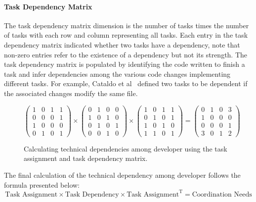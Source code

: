 \paragraph{Task Dependency Matrix}
The task dependency matrix dimension is the number of tasks times the number of tasks with each row and column representing all tasks.
Each entry in the task dependency matrix indicated whether two tasks have a dependency, note that non-zero entries refer to the existence of a dependency but not its strength.
The task dependency matrix is populated by identifying the code written to finish a task and infer dependencies among the various code changes implementing different tasks.
For example, Cataldo et al~\cite{cataldo:cscw:2006} defined two tasks to be dependent if the associated changes modify the same file. 

\begin{figure}[t!]
\centering
\[
\left(
\begin{matrix}
1 & 0 & 1 & 1\\
0 & 0 & 0 & 1\\
1 & 0 & 0 & 0\\
0 & 1 & 0 & 1
\end{matrix}
\right)
\times
\left(
\begin{matrix}
0 & 1 & 0 & 0\\
1 & 0 & 1 & 0\\
0 & 1 & 0 & 1\\
0 & 0 & 1 & 0
\end{matrix}
\right)
\times
\left(
\begin{matrix}
1 & 0 & 1 & 1\\
0 & 1 & 0 & 1\\
1 & 0 & 1 & 0\\
1 & 1 & 0 & 1
\end{matrix}
\right)
=
\left(
\begin{matrix}
0 & 1 & 0 & 3\\
1 & 0 & 0 & 0\\
0 & 0 & 0 & 1\\
3 & 0 & 1 & 2
\end{matrix}
\right)
\]
\caption{Calculating technical dependencies among developer using the task assignment and task dependency matrix.}
\label{chap:3:fig:example:stc:cataldo}
\end{figure}
The final calculation of the technical dependency among developer follows the formula presented below:
\begin{equation}
\label{eq:stc:cataldo}
\text{Task Assignment} \times \text{Task Dependency} \times \text{Task Assignment}^{\text{T}} = \text{Coordination Needs}
\end{equation}

